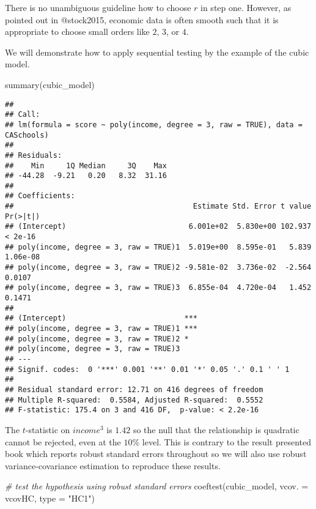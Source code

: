 \documentclass[
]{article}
\newenvironment{Shaded}{\begin{snugshade}}{\end{snugshade}}
\newcommand{\AttributeTok}[1]{\textcolor[rgb]{0.77,0.63,0.00}{#1}}
\newcommand{\CommentTok}[1]{\textcolor[rgb]{0.56,0.35,0.01}{\textit{#1}}}
\newcommand{\FunctionTok}[1]{\textcolor[rgb]{0.00,0.00,0.00}{#1}}
\newcommand{\NormalTok}[1]{#1}
\newcommand{\StringTok}[1]{\textcolor[rgb]{0.31,0.60,0.02}{#1}}
\begin{document}
There is no unambiguous guideline how to choose \(r\) in step one.
However, as pointed out in @stock2015, economic data is often smooth
such that it is appropriate to choose small orders like \(2\), \(3\), or
\(4\).

We will demonstrate how to apply sequential testing by the example of
the cubic model.

\begin{Shaded}
\begin{Highlighting}[]
\FunctionTok{summary}\NormalTok{(cubic\_model)}
\end{Highlighting}
\end{Shaded}

\begin{verbatim}
## 
## Call:
## lm(formula = score ~ poly(income, degree = 3, raw = TRUE), data = CASchools)
## 
## Residuals:
##    Min     1Q Median     3Q    Max 
## -44.28  -9.21   0.20   8.32  31.16 
## 
## Coefficients:
##                                         Estimate Std. Error t value Pr(>|t|)
## (Intercept)                            6.001e+02  5.830e+00 102.937  < 2e-16
## poly(income, degree = 3, raw = TRUE)1  5.019e+00  8.595e-01   5.839 1.06e-08
## poly(income, degree = 3, raw = TRUE)2 -9.581e-02  3.736e-02  -2.564   0.0107
## poly(income, degree = 3, raw = TRUE)3  6.855e-04  4.720e-04   1.452   0.1471
##                                          
## (Intercept)                           ***
## poly(income, degree = 3, raw = TRUE)1 ***
## poly(income, degree = 3, raw = TRUE)2 *  
## poly(income, degree = 3, raw = TRUE)3    
## ---
## Signif. codes:  0 '***' 0.001 '**' 0.01 '*' 0.05 '.' 0.1 ' ' 1
## 
## Residual standard error: 12.71 on 416 degrees of freedom
## Multiple R-squared:  0.5584, Adjusted R-squared:  0.5552 
## F-statistic: 175.4 on 3 and 416 DF,  p-value: < 2.2e-16
\end{verbatim}

The \(t\)-statistic on \(income^3\) is \(1.42\) so the null that the
relationship is quadratic cannot be rejected, even at the \(10\%\)
level. This is contrary to the result presented book which reports
robust standard errors throughout so we will also use robust
variance-covariance estimation to reproduce these results.

\begin{Shaded}
\begin{Highlighting}[]
\CommentTok{\# test the hypothesis using robust standard errors}
\FunctionTok{coeftest}\NormalTok{(cubic\_model, }\AttributeTok{vcov. =}\NormalTok{ vcovHC, }\AttributeTok{type =} \StringTok{"HC1"}\NormalTok{)}
\end{Highlighting}
\end{Shaded}
\end{document}
